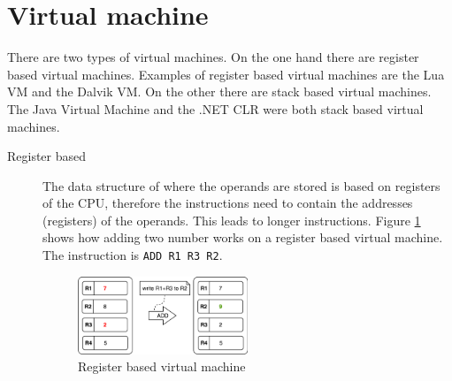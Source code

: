 \section{Virtual machine}
There are two types of virtual machines. On the one hand there are register based virtual machines. Examples of register based virtual machines are the Lua VM and the Dalvik VM. On the other there are stack based virtual machines. The Java Virtual Machine and the .NET CLR were both stack based virtual machines. 
\begin{description}
  \item[Register based] The data structure of where the operands are stored is based on registers of the CPU, therefore the instructions need to contain the addresses (registers) of the operands. This leads to longer instructions. Figure \ref{register vm} shows how adding two number works on a register based virtual machine. \cite{stackvsregistervm} The instruction is \texttt{ADD R1 R3 R2}.
  \begin{figure}[H]
	\begin{center}
	\includegraphics[width=0.5\textwidth]{./images/register-example}
	\caption{Register based virtual machine}
	\label{register vm}
	\end{center}
  \end{figure}
  

\end{description}
